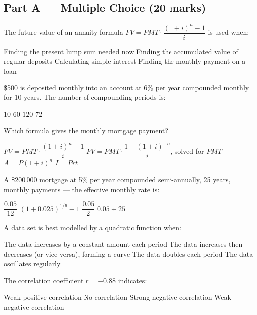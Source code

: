 \documentclass[addpoints]{exam}
\begin{document}
\newpage
\begin{questions}

\section*{Part A --- Multiple Choice (20 marks)}
\vspace{5mm}

\question[1] The future value of an annuity formula $FV = PMT \cdot \dfrac{(1+i)^n - 1}{i}$ is used when:
\begin{choices}
    \choice Finding the present lump sum needed now
    \correctchoice Finding the accumulated value of regular deposits
    \choice Calculating simple interest
    \choice Finding the monthly payment on a loan
\end{choices}

\question[1] \$500 is deposited monthly into an account at 6\% per year compounded monthly
for 10 years. The number of compounding periods is:
\begin{choices}
    \choice $10$
    \choice $60$
    \correctchoice $120$
    \choice $72$
\end{choices}

\question[1] Which formula gives the monthly mortgage payment?
\begin{choices}
    \choice $FV = PMT \cdot \dfrac{(1+i)^n - 1}{i}$
    \correctchoice $PV = PMT \cdot \dfrac{1-(1+i)^{-n}}{i}$, solved for $PMT$
    \choice $A = P(1+i)^n$
    \choice $I = Prt$
\end{choices}

\question[1] A \$200\,000 mortgage at 5\% per year compounded semi-annually, 25 years,
monthly payments — the effective monthly rate is:
\begin{choices}
    \choice $\dfrac{0.05}{12}$
    \correctchoice $(1 + 0.025)^{1/6} - 1$
    \choice $\dfrac{0.05}{2}$
    \choice $0.05 \div 25$
\end{choices}

\question[1] A data set is best modelled by a quadratic function when:
\begin{choices}
    \choice The data increases by a constant amount each period
    \correctchoice The data increases then decreases (or vice versa), forming a curve
    \choice The data doubles each period
    \choice The data oscillates regularly
\end{choices}

\question[1] The correlation coefficient $r = -0.88$ indicates:
\begin{choices}
    \choice Weak positive correlation
    \choice No correlation
    \correctchoice Strong negative correlation
    \choice Weak negative correlation
\end{choices}


\end{questions}
\end{document}
